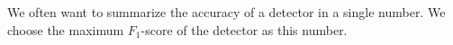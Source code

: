 \label{sec:eval}

We often want to summarize the accuracy of a detector in a single number. We choose the maximum $F_1$-score of the detector as this number.
